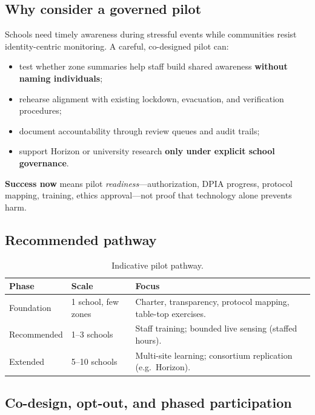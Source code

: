 \subsection{Why consider a governed pilot}

Schools need timely awareness during stressful events while communities resist identity-centric
monitoring.
A careful, co-designed pilot can:
\begin{itemize}[noitemsep]
  \item test whether zone summaries help staff build shared awareness \textbf{without naming individuals};
  \item rehearse alignment with existing lockdown, evacuation, and verification procedures;
  \item document accountability through review queues and audit trails;
  \item support Horizon or university research \textbf{only under explicit school governance}.
\end{itemize}

\textbf{Success now} means pilot \emph{readiness}---authorization, DPIA progress, protocol mapping,
training, ethics approval---not proof that technology alone prevents harm.

\subsection{Recommended pathway}

\begin{table}[htbp]
  \centering
  \caption{Indicative pilot pathway.}
  \label{tab:pilot-tiers-summary}
  \small
  \begin{tabular}{@{}p{2.4cm}p{2.8cm}p{5.8cm}@{}}
    \toprule
    Phase & Scale & Focus \\
    \midrule
    Foundation & 1 school, few zones &
      Charter, transparency, protocol mapping, table-top exercises. \\
    Recommended & 1--3 schools &
      Staff training; bounded live sensing (staffed hours). \\
    Extended & 5--10 schools &
      Multi-site learning; consortium replication (e.g.\ Horizon). \\
    \bottomrule
  \end{tabular}
\end{table}

\subsection{Co-design, opt-out, and phased participation}

